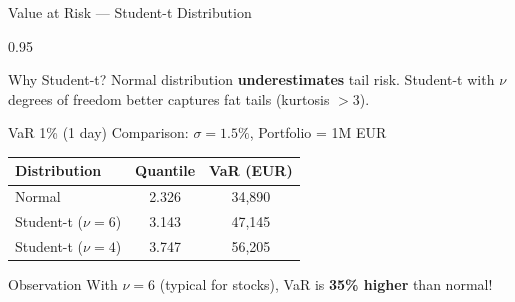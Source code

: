\documentclass[9pt, aspectratio=169, t]{beamer}
\begin{document}
\begin{frame}{Value at Risk --- Student-t Distribution}
    \begin{cminipage}{0.95\textwidth}
    \small
    \begin{block}{Why Student-t?}
        Normal distribution \textbf{underestimates} tail risk. Student-t with $\nu$ degrees of freedom better captures fat tails (kurtosis $> 3$).
    \end{block}

    \begin{exampleblock}{VaR 1\% (1 day) Comparison: $\sigma = 1.5\%$, Portfolio = 1M EUR}
        \begin{center}
            \small
            \begin{tabular}{lcc}
                \toprule
                \textbf{Distribution} & \textbf{Quantile} & \textbf{VaR (EUR)} \\
                \midrule
                Normal & 2.326 & 34,890 \\
                Student-t ($\nu = 6$) & 3.143 & 47,145 \\
                Student-t ($\nu = 4$) & 3.747 & 56,205 \\
                \bottomrule
            \end{tabular}
        \end{center}
    \end{exampleblock}

    \begin{alertblock}{Observation}
        With $\nu = 6$ (typical for stocks), VaR is \textbf{35\% higher} than normal!
    \end{alertblock}
    \end{cminipage}
\end{frame}
\end{document}
